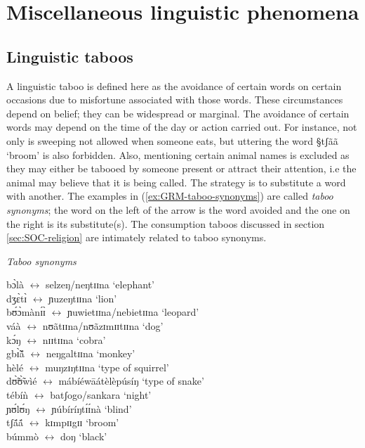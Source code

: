 \section{Miscellaneous linguistic phenomena}
\label{sec:GRM-mis-lin-phen}


\subsection{Linguistic taboos}
\label{sec:GRM-ling-taboo}

A linguistic taboo is defined here as the avoidance of
certain words on certain occasions due to  misfortune associated with those
words. 
These circumstances depend on belief; they can be widespread or marginal. The
avoidance of certain words may depend on the time of the day or action carried
out. For instance, not only  is sweeping  not allowed when someone eats, but
uttering the word {\S tʃãã} `broom' is also forbidden. Also, mentioning
certain animal names is excluded as they may either be tabooed by someone
present or attract their attention, i.e the animal may believe that it is being
called. The strategy is to substitute a word with another. The examples in
(\ref{ex:GRM-taboo-synonyms})  are called {\it taboo synonyms}; the word on the
left of the arrow is the word avoided and the one on the right is its
substitute(s). The consumption taboos discussed in section
\ref{sec:SOC-religion} are intimately related to taboo synonyms.


\begin{exe}
\ex\label{ex:GRM-taboo-synonyms}{\it Taboo synonyms}

 {\I bɔ̀là} $\leftrightarrow$ {\I selzeŋ}/{\I neŋtɪɪna} `elephant'\\
{\I dʒɛ̀tɪ̀} $\leftrightarrow$ {\I ɲuzeŋtɪɪna} `lion'\\
{\I bʊ́ɔ̀mànɪ́ɪ̀} $\leftrightarrow$ {\I ɲuwietɪɪna}/{\I nebietɪɪna} `leopard'\\
{\I váà} $\leftrightarrow$ {\I nʊãtɪɪna}/{\I nʊãzɪmɪɪtɪɪna} `dog'\\
{\I kɔ́ŋ} $\leftrightarrow$ {\I nɪɪtɪɪna} `cobra' \\
{\I gbɪ̃̀ã́} $\leftrightarrow$ {\I neŋgaltɪɪna} `monkey'\\
{\I hèlé} $\leftrightarrow$ {\I muŋzɪŋtɪɪna} `type of squirrel'\\
{\I dʊ̃̀ʊ̃̀wìé} $\leftrightarrow$ {\I mábíéwāátèlèpúsíŋ} `type of
snake'\\
{\I tébíǹ} $\leftrightarrow$ {\I batʃogo}/{\I sankara} `night'\\
{\I ɲʊ́lʊ́ŋ} $\leftrightarrow$ {\I ɲúbíríŋtɪ́ɪ́nà} `blind'\\
{\I tʃã́ã́} $\leftrightarrow$ {\I kɪmpɪɪgɪɪ} `broom'\\
{\I búmmò} $\leftrightarrow$ {\I doŋ} `black'\\

\end{exe}

